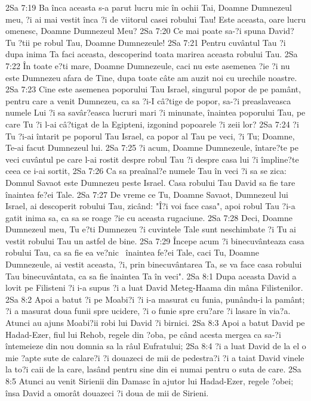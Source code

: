 2Sa 7:19  Ba înca aceasta s-a parut lucru mic în ochii Tai, Doamne Dumnezeul meu, ?i ai mai vestit înca ?i de viitorul casei robului Tau! Este aceasta, oare lucru omenesc, Doamne Dumnezeul Meu?
2Sa 7:20  Ce mai poate sa-?i spuna David? Tu ?tii pe robul Tau, Doamne Dumnezeule!
2Sa 7:21  Pentru cuvântul Tau ?i dupa inima Ta faci aceasta, descoperind toata marirea aceasta robului Tau.
2Sa 7:22  În toate e?ti mare, Doamne Dumnezeule, caci nu este asemenea ?ie ?i nu este Dumnezeu afara de Tine, dupa toate câte am auzit noi cu urechile noastre.
2Sa 7:23  Cine este asemenea poporului Tau Israel, singurul popor de pe pamânt, pentru care a venit Dumnezeu, ca sa ?i-I câ?tige de popor, sa-?i preaslaveasca numele Lui ?i sa savâr?easca lucruri mari ?i minunate, înaintea poporului Tau, pe care Tu ?i l-ai câ?tigat de la Egipteni, izgonind popoarele ?i zeii lor?
2Sa 7:24  ?i Tu ?i-ai întarit pe poporul Tau Israel, ca popor al Tau pe veci, ?i Tu; Doamne, Te-ai facut Dumnezeul lui.
2Sa 7:25  ?i acum, Doamne Dumnezeule, întare?te pe veci cuvântul pe care l-ai rostit despre robul Tau ?i despre casa lui ?i împline?te ceea ce i-ai sortit,
2Sa 7:26  Ca sa preaînal?e numele Tau în veci ?i sa se zica: Domnul Savaot este Dumnezeu peste Israel. Casa robului Tau David sa fie tare înaintea fe?ei Tale.
2Sa 7:27  De vreme ce Tu, Doamne Savaot, Dumnezeul lui Israel, ai descoperit robului Tau, zicând: "Î?i voi face casa", apoi robul Tau ?i-a gatit inima sa, ca sa se roage ?ie cu aceasta rugaciune.
2Sa 7:28  Deci, Doamne Dumnezeul meu, Tu e?ti Dumnezeu ?i cuvintele Tale sunt neschimbate ?i Tu ai vestit robului Tau un astfel de bine.
2Sa 7:29  Începe acum ?i binecuvânteaza casa robului Tau, ca sa fie ea ve?nic  înaintea fe?ei Tale, caci Tu, Doamne Dumnezeule, ai vestit aceasta, ?i, prin binecuvântarea Ta, se va face casa robului Tau binecuvântata, ca sa fie înaintea Ta în veci".
2Sa 8:1  Dupa aceasta David a lovit pe Filisteni ?i i-a supus ?i a luat David Meteg-Haama din mâna Filistenilor.
2Sa 8:2  Apoi a batut ?i pe Moabi?i ?i i-a masurat cu funia, punându-i la pamânt; ?i a masurat doua funii spre ucidere, ?i o funie spre cru?are ?i lasare în via?a. Atunci au ajuns Moabi?ii robi lui David ?i birnici.
2Sa 8:3  Apoi a batut David pe Hadad-Ezer, fiul lui Rehob, regele din ?oba, pe când acesta mergea ca sa-?i întemeieze din nou domnia sa la râul Eufratului;
2Sa 8:4  ?i a luat David de la el o mie ?apte sute de calare?i ?i douazeci de mii de pedestra?i ?i a taiat David vinele la to?i caii de la care, lasând pentru sine din ei numai pentru o suta de care.
2Sa 8:5  Atunci au venit Sirienii din Damasc în ajutor lui Hadad-Ezer, regele ?obei; însa David a omorât douazeci ?i doua de mii de Sirieni.
